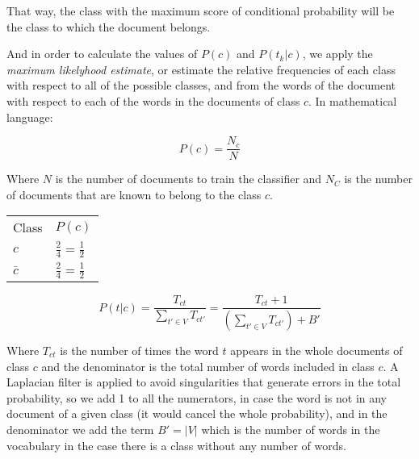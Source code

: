 That way, the class with the maximum score of conditional probability will be the class to which the document belongs.


And in order to calculate the values of $P(c)$ and $P(t_k|c)$, we apply the \textit{maximum likelyhood estimate}, or estimate the relative frequencies of each class with respect to all of the possible classes, and from the words of the document with respect to each of the words in the documents of class $c$. In mathematical language:

\begin{equation}
    P(c) = \frac{N_c}{N}
\end{equation}

Where $N$ is the number of documents to train the classifier and $N_C$ is the number of documents that are known to belong to the class $c$.

\begin{table}[H]
\begin{tabular}{ll}
Class & $P(c)$ \\
$c$ & $\frac{2}{4} = \frac{1}{2}$ \\
$\bar{c}$ & $\frac{2}{4} = \frac{1}{2}$
\end{tabular}
\end{table}

\begin{equation}
    P(t|c) = \frac{T_{ct}}{\sum_{t' \in V} T_{ct'}} = \frac{T_{ct} + 1}{(\sum_{t' \in V} T_{ct'}) + B'}
\end{equation}

Where $T_{ct}$ is the number of times the word $t$ appears in the whole documents of class $c$ and the denominator is the total number of words included in class $c$. A Laplacian filter is applied to avoid singularities that generate errors in the total probability, so we add 1 to all the numerators, in case the word is not in any document of a given class (it would cancel the whole probability), and in the denominator we add the term $B' = |V|$ which is the number of words in the vocabulary in the case there is a class without any number of words. 

